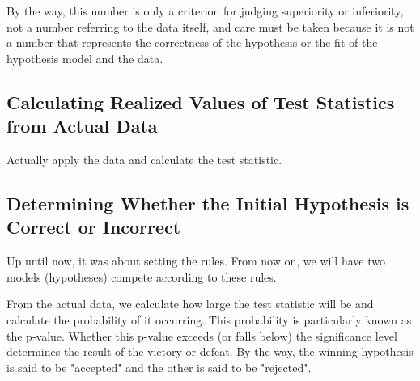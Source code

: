 \documentclass{ltjsbook}
\begin{document}
By the way, this number is only a criterion for judging superiority or inferiority, not a number referring to the data itself, and care must be taken because it is not a number that represents the correctness of the hypothesis or the fit of the hypothesis model and the data.

\subsection{Calculating Realized Values of Test Statistics from Actual Data}

Actually apply the data and calculate the test statistic.
\subsection{Determining Whether the Initial Hypothesis is Correct or Incorrect}
Up until now, it was about setting the rules. From now on, we will have two models (hypotheses) compete according to these rules.

From the actual data, we calculate how large the test statistic will be and calculate the probability of it occurring. This probability is particularly known as the p-value. Whether this p-value exceeds (or falls below) the significance level determines the result of the victory or defeat. By the way, the winning hypothesis is said to be "accepted" and the other is said to be "rejected".
\end{document}
